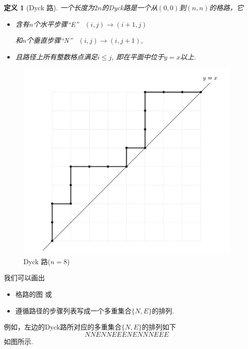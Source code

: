 \documentclass[punct]{beamer}
\newtheorem{defi}[thm]{定义}
\begin{document}
\begin{frame}
\begin{defi}[Dyck 路]
        一个长度为$2n$的Dyck路是一个从$(0,0)$到$(n,n)$的格路，它
        \begin{itemize}
            \item 含有$n$个水平步骤``E'' \ $(i, j) \rightarrow (i + 1, j)$

            \quad 和$n$个垂直步骤``N'' \ $(i, j) \rightarrow (i, j + 1)$,
            \item 且路径上所有整数格点满足$i\le j$,
            即在平面中位于$y = x$以上.
        \end{itemize}
\end{defi}


\begin{minipage}{0.55\linewidth}
\begin{figure}[h]
    \centering
    \includegraphics[width=0.8\linewidth]{path-8.png}
    \caption{Dyck 路($n=8$)}
\end{figure}
\end{minipage}
\begin{minipage}{0.4\linewidth}
\pause
我们可以画出
\begin{itemize}
\item 格路的\alert{图}
或
\item 遵循路径的步骤列表写成一个多重集合$\{N, E\}$的\alert{排列}.
\end{itemize}




例如，左边的Dyck路所对应的多重集合$\{N, E\}$的\alert{排列}如下
$$NNENNEEENENNNEEE$$如图所示.
\end{minipage}





\end{frame}
\end{document}
